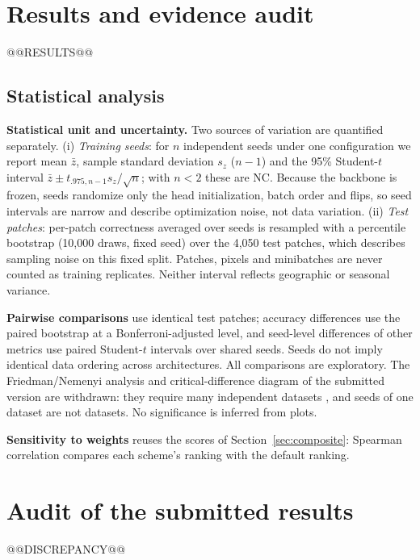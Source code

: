 \documentclass[3p,times,procedia]{elsarticle}
\newcommand{\NC}{\textsc{NC}}
\begin{document}
\section{Results and evidence audit}\label{sec:results}
@@RESULTS@@

\subsection{Statistical analysis}\label{sec:statistics}
\textbf{Statistical unit and uncertainty.} Two sources of variation are quantified separately. (i) \emph{Training seeds}: for $n$ independent seeds under one configuration we report mean $\bar z$, sample standard deviation $s_z$ ($n-1$) and the 95\% Student-$t$ interval $\bar z\pm t_{.975,n-1}s_z/\sqrt n$; with $n<2$ these are \NC{}. Because the backbone is frozen, seeds randomize only the head initialization, batch order and flips, so seed intervals are narrow and describe optimization noise, not data variation. (ii) \emph{Test patches}: per-patch correctness averaged over seeds is resampled with a percentile bootstrap (10,000 draws, fixed seed) over the 4,050 test patches, which describes sampling noise on this fixed split. Patches, pixels and minibatches are never counted as training replicates. Neither interval reflects geographic or seasonal variance.

\textbf{Pairwise comparisons} use identical test patches; accuracy differences use the paired bootstrap at a Bonferroni-adjusted level, and seed-level differences of other metrics use paired Student-$t$ intervals over shared seeds. Seeds do not imply identical data ordering across architectures. All comparisons are exploratory. The Friedman/Nemenyi analysis and critical-difference diagram of the submitted version are withdrawn: they require many independent datasets \cite{statistics}, and seeds of one dataset are not datasets. No significance is inferred from plots.

\textbf{Sensitivity to weights} reuses the scores of Section~\ref{sec:composite}: Spearman correlation compares each scheme's ranking with the default ranking.

\section{Audit of the submitted results}\label{sec:discrepancy}
@@DISCREPANCY@@
\end{document}
